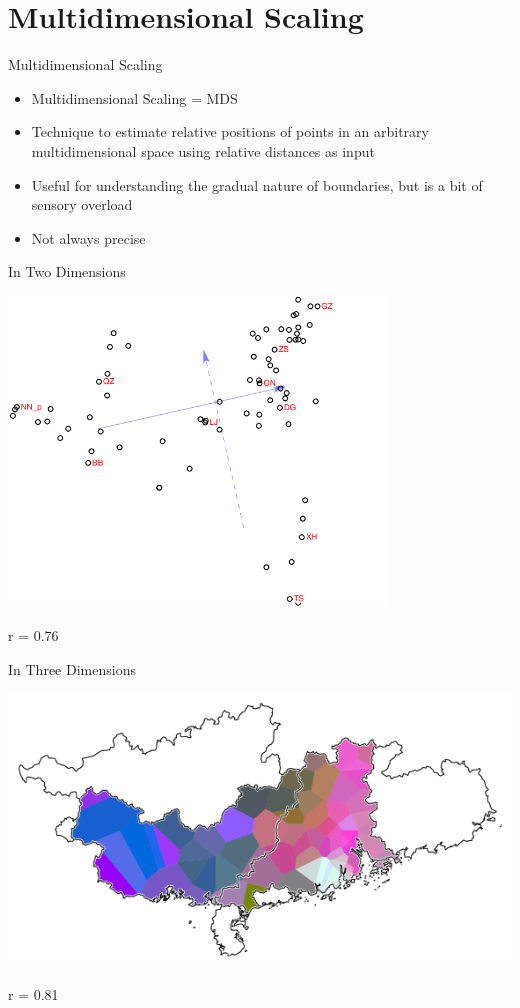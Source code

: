 \documentclass[presentation]{beamer}
\begin{document}
\section{Multidimensional Scaling}
\label{sec:org974a7f6}
\begin{frame}[label={sec:orgaddf802}]{Multidimensional Scaling}
\textcite{kruskal1964nonmetricmultidimensional}
\begin{itemize}
\item Multidimensional Scaling = MDS
\item Technique to estimate relative positions of points in an arbitrary multidimensional space using relative distances as input
\item Useful for understanding the gradual nature of boundaries, but is a bit of sensory overload
\item Not always precise
\end{itemize}
\end{frame}
\begin{frame}[label={sec:org31ece59}]{In Two Dimensions}
\begin{center}
\includegraphics[width=0.75\textwidth]{plot2d.png}
\end{center}
r = 0.76
\end{frame}

\begin{frame}[label={sec:orgc180c21}]{In Three Dimensions}
\begin{center}
\includegraphics[width=.9\linewidth]{standard.png}
\end{center}
r = 0.81
\end{frame}
\end{document}
